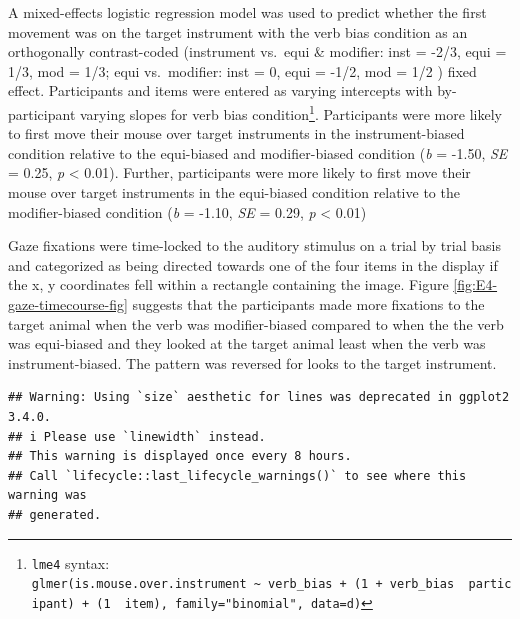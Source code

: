 \documentclass[
  man,floatsintext]{apa6}
\begin{document}
A mixed-effects logistic regression model was used to predict whether the first movement was on the target instrument with the verb bias condition as an orthogonally contrast-coded (instrument vs.~equi \& modifier: inst = -2/3, equi = 1/3, mod = 1/3; equi vs.~modifier: inst = 0, equi = -1/2, mod = 1/2 ) fixed effect. Participants and items were entered as varying intercepts with by-participant varying slopes for verb bias condition\footnote{\texttt{lme4} syntax: \texttt{glmer(is.mouse.over.instrument\ \textasciitilde{}\ verb\_bias\ +\ (1\ +\ verb\_bias\ \textbar{}\ participant)\ +\ (1\ \textbar{}\ item),\ family="binomial",\ data=d)}}. Participants were more likely to first move their mouse over target instruments in the instrument-biased condition relative to the equi-biased and modifier-biased condition (\emph{b} = -1.50, \emph{SE} = 0.25, \emph{p} \textless{} 0.01). Further, participants were more likely to first move their mouse over target instruments in the equi-biased condition relative to the modifier-biased condition (\emph{b} = -1.10, \emph{SE} = 0.29, \emph{p} \textless{} 0.01)

Gaze fixations were time-locked to the auditory stimulus on a trial by trial basis and categorized as being directed towards one of the four items in the display if the x, y coordinates fell within a rectangle containing the image. Figure \ref{fig:E4-gaze-timecourse-fig} suggests that the participants made more fixations to the target animal when the verb was modifier-biased compared to when the the verb was equi-biased and they looked at the target animal least when the verb was instrument-biased. The pattern was reversed for looks to the target instrument.

\begin{verbatim}
## Warning: Using `size` aesthetic for lines was deprecated in ggplot2 3.4.0.
## i Please use `linewidth` instead.
## This warning is displayed once every 8 hours.
## Call `lifecycle::last_lifecycle_warnings()` to see where this warning was
## generated.
\end{verbatim}
\end{document}
